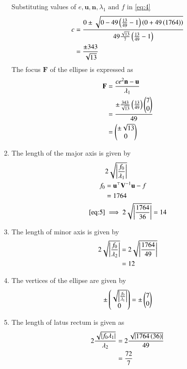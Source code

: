 \documentclass[journal,12pt,twocolumn]{IEEEtran}
\renewcommand{\vec}[1]{\boldsymbol{\mathbf{#1}}}
\begin{document}
\begin{enumerate}
Substituting values of $e,\vec{u},\vec{n},\lambda_1 \text{ and } f$ in \eqref{eq:4}
\begin{align}
	c &= \frac{0 \pm \sqrt{0-49\left(\frac{13}{49}-1\right)\left(0+49\left(1764\right)\right)}}{49\frac{\sqrt{13}}{7}\left(\frac{13}{49}-1\right)}\\
	&= \frac{\pm 343}{\sqrt{13}}
\end{align}
The focus $\vec{F}$ of the ellipse is expressed as
\begin{align}
	\vec{F} &= \frac{ce^2 \vec{n}-\vec{u}}{\lambda_1}\\
	&= \frac{\pm \frac{343}{\sqrt{13}}\brak{\frac{13}{49}}\myvec{7\\0}}{49}\\
	&= \myvec{\pm \sqrt{13}\\0}
\end{align}
\item The length of the major axis is given by
\begin{align}
	\label{eq:5}
	&2\sqrt{\abs{\frac{f_0}{\lambda_1}}}\\
	f_0 &= \vec{u}^\top \vec{V}^{-1} \vec{u} -f\\
	    &= 1764\\
	\eqref{eq:5} &\implies 2\sqrt{\abs{\frac{1764}{36}}}
	 = 14
\end{align}
\item The length of minor axis is given by
\begin{align}
	2\sqrt{\left\vert\frac{f_0}{\lambda_2}\right\vert}&= 2\sqrt{\left\vert\frac{1764}{49}\right\vert}\\
	&= 12
\end{align}
\item The vertices of the ellipse are given by
\begin{align}
	\pm \begin{pmatrix}\sqrt{\left\vert\frac{f_0}{\lambda_1}\right\vert}\\0\end{pmatrix}= \pm \begin{pmatrix}7\\0\end{pmatrix}
\end{align}
\item The length of latus rectum is given as
\begin{align}
	2\frac{\sqrt{\left\vert f_0 \lambda_1\right\vert}}{\lambda_2} &= 2\frac{\sqrt{\left\vert1764\left(36\right)\right\vert}}{49}\\
	&= \frac{72}{7}
\end{align}
\end{enumerate}
\end{document}
